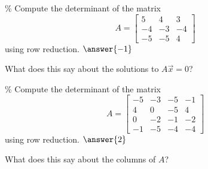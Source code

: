 \documentclass{ximera}
\begin{document}
\begin{exercise}\%
    Compute the determinant of the matrix
    \[ A = \begin{bmatrix}
        5 & 4  & 3\\
        -4 &-3 &-4\\
        -5 &-5 & 4
    \end{bmatrix}
    \]
    using row reduction.  $\answer{-1}$
    \begin{problem}
        What does this say about the solutions to $A\vec{x} = 0$?
        \begin{multipleChoice}
        \end{multipleChoice}
    \end{problem}
\end{exercise}

\begin{exercise}\%
    Compute the determinant of the matrix
    \[ A = \begin{bmatrix}
        -5 & -3 & -5 & -1\\
        4 & 0 &-5 &  4\\
        0&-2 &-1 &-2\\
        -1& -5 &-4 &-4
    \end{bmatrix}
    \]
    using row reduction.  $\answer{2}$
    \begin{problem}
        What does this say about the columns of $A$?
        \begin{multipleChoice}
        \end{multipleChoice}
    \end{problem}
\end{exercise}
\end{document}
